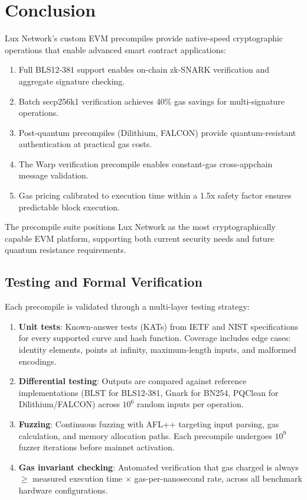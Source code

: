 \documentclass[11pt,a4paper]{article}
\begin{document}
\section{Conclusion}\label{sec:conclusion}

Lux Network's custom EVM precompiles provide native-speed cryptographic operations that enable advanced smart contract applications:

\begin{enumerate}
    \item Full BLS12-381 support enables on-chain zk-SNARK verification and aggregate signature checking.
    \item Batch secp256k1 verification achieves 40\% gas savings for multi-signature operations.
    \item Post-quantum precompiles (Dilithium, FALCON) provide quantum-resistant authentication at practical gas costs.
    \item The Warp verification precompile enables constant-gas cross-appchain message validation.
    \item Gas pricing calibrated to execution time within a 1.5x safety factor ensures predictable block execution.
\end{enumerate}

The precompile suite positions Lux Network as the most cryptographically capable EVM platform, supporting both current security needs and future quantum resistance requirements.

\subsection{Testing and Formal Verification}

Each precompile is validated through a multi-layer testing strategy:

\begin{enumerate}
    \item \textbf{Unit tests}: Known-answer tests (KATs) from IETF and NIST specifications for every supported curve and hash function. Coverage includes edge cases: identity elements, points at infinity, maximum-length inputs, and malformed encodings.
    \item \textbf{Differential testing}: Outputs are compared against reference implementations (BLST for BLS12-381, Gnark for BN254, PQClean for Dilithium/FALCON) across $10^6$ random inputs per operation.
    \item \textbf{Fuzzing}: Continuous fuzzing with AFL++ targeting input parsing, gas calculation, and memory allocation paths. Each precompile undergoes $10^9$ fuzzer iterations before mainnet activation.
    \item \textbf{Gas invariant checking}: Automated verification that gas charged is always $\geq$ measured execution time $\times$ gas-per-nanosecond rate, across all benchmark hardware configurations.
\end{enumerate}
\end{document}
